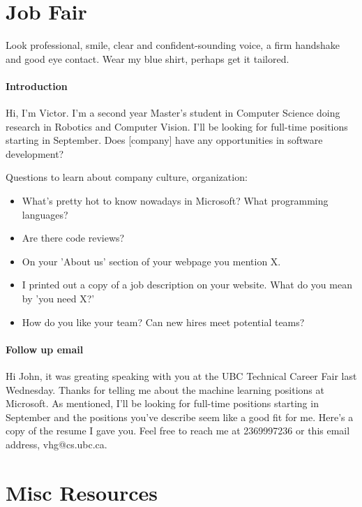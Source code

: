 \section{Job Fair}

Look professional, smile, clear and confident-sounding voice, a firm handshake
and good eye contact. Wear my blue shirt, perhaps get it tailored.

\paragraph{Introduction} Hi, I'm Victor. I'm a second year Master's student in Computer Science doing
research in Robotics and Computer Vision. I'll be looking for full-time
positions starting in September. Does [company] have any opportunities in
software development?

Questions to learn about company culture, organization:
\begin{itemize}
    \item What's pretty hot to know nowadays in Microsoft? What programming
    languages?
    \item Are there code reviews?
    \item On your 'About us' section of your webpage you mention X.
    \item I printed out a copy of a job description on your website. What do you
    mean by 'you need X?'
    \item How do you like your team? Can new hires meet potential teams?
\end{itemize}

\paragraph{Follow up email} Hi John, it was greating speaking with you at the
UBC Technical Career Fair last Wednesday. Thanks for telling me about the
machine learning positions at Microsoft. As mentioned, I'll be looking for
full-time positions starting in September and the positions you've describe seem
like a good fit for me. Here's a copy of the resume I gave you. Feel free to
reach me at 2369997236 or this email address, vhg@cs.ubc.ca.


\section{Misc Resources}

